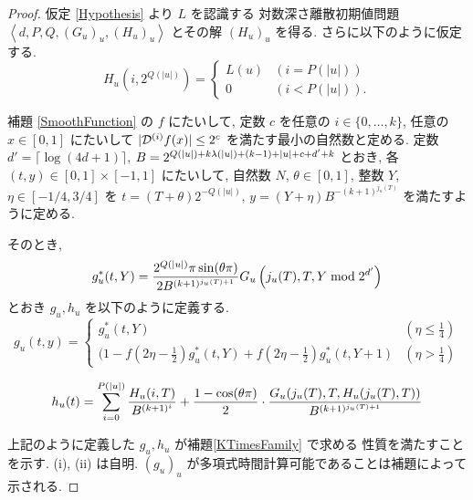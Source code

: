   \begin{proof}
  仮定 \ref{Hypothesis} より $L$ を認識する 
  対数深さ離散初期値問題 $\left< d, P, Q,(G_u)_u,(H_u)_u \right>$
  とその解 $(H_u)_u$ を得る.
  さらに以下のように仮定する.
  \begin{equation}
   H_u(i, 2^{Q(|u|)}) = \begin{cases}
			L(u) & (i=P(|u|)) \\
			0 & (i<P(|u|)).
			\end{cases}
  \end{equation}

    補題 \ref{SmoothFunction} の $f$ にたいして, 
 定数 $c$ を任意の $i \in \{0, \dots, k\}$, 任意の $x \in [0,1]$ にたいして $|\mathcal D^{(i)} f(x)| \le 2^c$ を満たす最小の自然数と定める.
 定数 $d' = \lceil \log (4d + 1) \rceil$, 
 $B = 2^{{Q(|u|)} + k {\lambda(|u|)} + (k - 1) + |u| + c + d' + k}$ とおき, 
 各 $(t, y) \in [0,1] \times [-1, 1]$ にたいして,
 自然数 $N$, $\theta \in [0,1]$, 整数 $Y$, $\eta \in [-1/4, 3/4]$ を
 $t = (T + \theta)2^{-Q(|u|)}$, $y = (Y + \eta)B^{-(k+1)^{j_u(T)}}$ 
  を満たすように定める.
 
 そのとき,
 \begin{equation}
  g^*_u(t, Y) = \frac{2^{Q(|u|)} \pi \sin (\theta\pi)}{2 B^{(k+1)^{j_u(T)+1}}}
   G_u\left( j_u(T), T, Y \bmod 2^{d'} \right)
 \end{equation}
 とおき $g_u, h_u$ を以下のように定義する.
 \begin{equation}
  g_u(t,y) 
  = \begin{cases}
     g^*_u(t, Y)& (\eta \le \frac 1 4) \\
     ( 1-f \left( 2\eta - \frac 1 2 \right)g^*_u(t, Y) 
     + f \left( 2\eta -  \frac 1 2 \right) g^*_u(t, Y+1)
     & (\eta > \frac 1 4)
    \end{cases}
  \label{ktimes:eq:gu}
 \end{equation}

 \begin{equation} 
  h_u(t) = \sum^{{P(|u|)}}_{i=0} \frac{H_u(i, T)}{B^{(k+1)^i}}
  + \frac{1-\cos(\theta\pi)}{2} 
  \cdot \frac{G_u(j_u(T), T, H_u(j_u(T), T))}{B^{(k+1)^{j_u(T)+1}}}
  \label{ktimes:eq:hu}
 \end{equation}

 上記のように定義した $g_u, h_u$ が補題\ref{KTimesFamily} で求める
 性質を満たすことを示す. (i), (ii) は自明. 
 $(g_u)_u$ が多項式時間計算可能であることは補題によって示される.


\end{proof}
